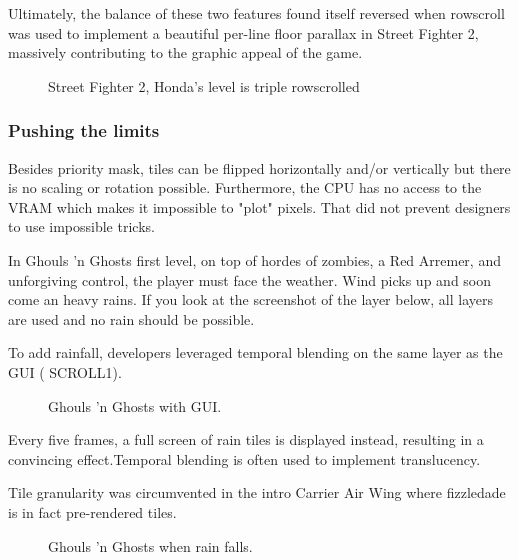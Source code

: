 Ultimately, the balance of these two features found itself reversed when rowscroll was used to implement a beautiful per-line floor parallax in Street Fighter 2, massively contributing to the graphic appeal of the game.


\vfill
\begin{figure}[!b]
 \caption*{Street Fighter 2, Honda's level is triple rowscrolled}%
 \end{figure}%
\pagebreak







\subsubsection{Pushing the limits}

Besides priority mask, tiles can be flipped horizontally and/or vertically but there is no scaling or rotation possible. Furthermore, the CPU has no access to the VRAM which makes it impossible to "plot" pixels. That did not prevent designers to use impossible tricks.



In Ghouls 'n Ghosts first level, on top of hordes of zombies, a Red Arremer, and unforgiving control, the player must face the weather. Wind picks up and soon come an heavy rains. If you look at the screenshot of the layer below, all layers are used and no rain should be possible.

To add rainfall, developers leveraged temporal blending on the same layer as the GUI ( SCROLL1). 

\vfill
\begin{figure}[!b]
 \caption*{Ghouls 'n Ghosts with GUI.}%
 \end{figure}%
\pagebreak

Every five frames, a full screen of rain tiles is displayed instead, resulting in a convincing effect.Temporal blending is often used to implement translucency. 

Tile granularity was circumvented in the intro Carrier Air Wing where fizzledade is in fact pre-rendered tiles.

 

\vfill
\begin{figure}[!b]
 \caption*{Ghouls 'n Ghosts when rain falls.}%
 \end{figure}%
\pagebreak





